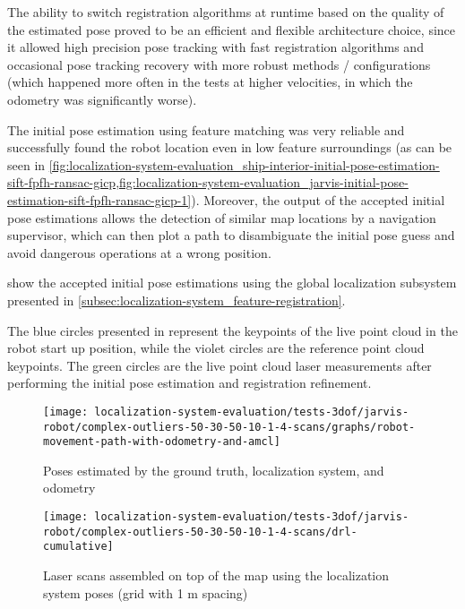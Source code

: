 The ability to switch registration algorithms at runtime based on the quality of the estimated pose proved to be an efficient and flexible architecture choice, since it allowed high precision pose tracking with fast registration algorithms and occasional pose tracking recovery with more robust methods / configurations (which happened more often in the tests at higher velocities, in which the odometry was significantly worse).

The initial pose estimation using feature matching was very reliable and successfully found the robot location even in low feature surroundings (as can be seen in \cref{fig:localization-system-evaluation_ship-interior-initial-pose-estimation-sift-fpfh-ransac-gicp,fig:localization-system-evaluation_jarvis-initial-pose-estimation-sift-fpfh-ransac-gicp-1}). Moreover, the output of the accepted initial pose estimations allows the detection of similar map locations by a navigation supervisor, which can then plot a path to disambiguate the initial pose guess and avoid dangerous operations at a wrong position.

 show the accepted initial pose estimations using the global localization subsystem presented in \cref{subsec:localization-system_feature-registration}.

The blue circles presented in  represent the keypoints of the live point cloud in the robot start up position, while the violet circles are the reference point cloud keypoints. The green circles are the live point cloud laser measurements after performing the initial pose estimation and registration refinement.


\begin{figure}[H]
	\centering
	\texttt{[image: localization-system-evaluation/tests-3dof/jarvis-robot/complex-outliers-50-30-50-10-1-4-scans/graphs/robot-movement-path-with-odometry-and-amcl]}
	\caption{Poses estimated by the ground truth, localization system,  and odometry}
	\label{fig:localization-system-evaluation_complex-path-with-outliers-50-30-50-10cm-per-sec-velocity-1-4-scans-paths}
\end{figure}

\begin{figure}[H]
	\centering
	\texttt{[image: localization-system-evaluation/tests-3dof/jarvis-robot/complex-outliers-50-30-50-10-1-4-scans/drl-cumulative]}
	\caption{Laser scans assembled on top of the map using the localization system poses (grid with 1 m spacing)}
	\label{fig:localization-system-evaluation_complex-path-with-outliers-50-30-50-10cm-per-sec-velocity-1-4-scans-drl-cumulative}
\end{figure}

